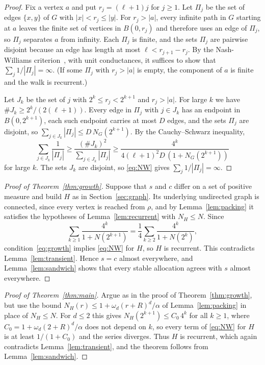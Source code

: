 \documentclass[11pt]{amsart}
\theoremstyle{remark}
\numberwithin{equation}{section}
\begin{document}
\begin{proof}
Fix a vertex $a$ and put $r_j=(\ell+1)j$ for $j\ge1$. Let $\Pi_j$ be the set of edges $\{x,y\}$ of $G$ with $|x|<r_j\le|y|$. For $r_j>|a|$, every infinite path in $G$ starting at $a$ leaves the finite set of vertices in $B(0,r_j)$ and therefore uses an edge of $\Pi_j$, so $\Pi_j$ separates $a$ from infinity. Each $\Pi_j$ is finite, and the sets $\Pi_j$ are pairwise disjoint because an edge has length at most $\ell<r_{j+1}-r_j$. By the Nash-Williams criterion~\cite{NW}, \cite[Section~2.5, (2.14)]{LyonsPeres} with unit conductances, it suffices to show that $\sum_j1/|\Pi_j|=\infty$. (If some $\Pi_j$ with $r_j>|a|$ is empty, the component of $a$ is finite and the walk is recurrent.)

Let $J_k$ be the set of $j$ with $2^k\le r_j<2^{k+1}$ and $r_j>|a|$. For large $k$ we have $\#J_k\ge2^k/(2(\ell+1))$. Every edge in $\Pi_j$ with $j\in J_k$ has an endpoint in $B(0,2^{k+1})$, each such endpoint carries at most $D$ edges, and the sets $\Pi_j$ are disjoint, so $\sum_{j\in J_k}|\Pi_j|\le D\,N_G(2^{k+1})$. By the Cauchy--Schwarz inequality,
\[
\sum_{j\in J_k}\frac1{|\Pi_j|}\ge\frac{(\#J_k)^2}{\sum_{j\in J_k}|\Pi_j|}\ge\frac{4^k}{4(\ell+1)^2D\,(1+N_G(2^{k+1}))}
\]
for large $k$. The sets $J_k$ are disjoint, so \eqref{eq:NW} gives $\sum_j1/|\Pi_j|=\infty$.
\end{proof}

\begin{proof}[Proof of Theorem~\ref{thm:growth}]
Suppose that $s$ and $c$ differ on a set of positive measure and build $H$ as in Section~\ref{sec:graph}. Its underlying undirected graph is connected, since every vertex is reached from $\rho$, and by Lemma~\ref{lem:packing} it satisfies the hypotheses of Lemma~\ref{lem:recurrent} with $N_H\le N$. Since
\[
\sum_{k\ge1}\frac{4^k}{1+N(2^{k+1})}=\frac14\sum_{k\ge2}\frac{4^{k}}{1+N(2^{k})},
\]
condition~\eqref{eq:growth} implies \eqref{eq:NW} for $H$, so $H$ is recurrent. This contradicts Lemma~\ref{lem:transient}. Hence $s=c$ almost everywhere, and Lemma~\ref{lem:sandwich} shows that every stable allocation agrees with $s$ almost everywhere.
\end{proof}

\begin{proof}[Proof of Theorem~\ref{thm:main}]
Argue as in the proof of Theorem~\ref{thm:growth}, but use the bound $N_H(r)\le1+\omega_d(r+R)^d/\alpha$ of Lemma~\ref{lem:packing} in place of $N_H\le N$. For $d\le2$ this gives $N_H(2^{k+1})\le C_0\,4^k$ for all $k\ge1$, where $C_0=1+\omega_d(2+R)^d/\alpha$ does not depend on $k$, so every term of \eqref{eq:NW} for $H$ is at least $1/(1+C_0)$ and the series diverges. Thus $H$ is recurrent, which again contradicts Lemma~\ref{lem:transient}, and the theorem follows from Lemma~\ref{lem:sandwich}.
\end{proof}
\end{document}
